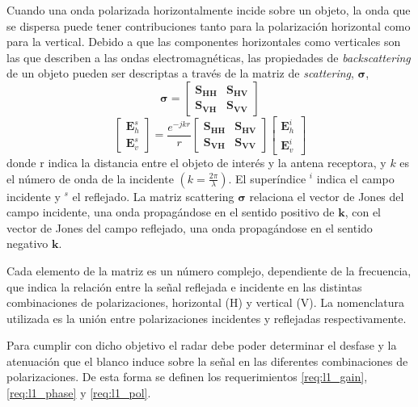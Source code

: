 Cuando una onda polarizada horizontalmente incide sobre un objeto, la onda que se dispersa puede tener contribuciones tanto para la polarización horizontal como para la vertical. Debido a que las componentes horizontales como verticales son las que describen a las ondas electromagnéticas, las propiedades de \textit{backscattering} de un objeto pueden ser descriptas a través de la matriz de \textit{scattering}, $\bm{\sigma}$,
\begin{equation}
  \bm{\sigma} = \begin{bmatrix} \bm{S}_{\bm{HH}} & \bm{S}_{\bm{HV}} \\ \bm{S}_{\bm{VH}} & \bm{S}_{\bm{VV}} \end{bmatrix}
\end{equation}
\begin{equation}
  \begin{bmatrix} \bm{E}_h^s \\ \bm{E}_v^s \end{bmatrix} = \dfrac{e^{-jkr}}{r} \begin{bmatrix} \bm{S}_{\bm{HH}} & \bm{S}_{\bm{HV}} \\ \bm{S}_{\bm{VH}} & \bm{S}_{\bm{VV}} \end{bmatrix} \begin{bmatrix} \bm{E}_h^i \\ \bm{E}_v^i \end{bmatrix}
\end{equation}
donde r indica la distancia entre el objeto de interés y la antena receptora, y $k$ es el número de onda de la incidente $(k = \frac{2\pi}{\lambda})$. El superíndice $^i$ indica el campo incidente y $^s$ el reflejado. La matriz scattering $\bm{\sigma}$ relaciona el vector de Jones del campo incidente, una onda propagándose en el sentido positivo de $\bm{k}$, con el vector de Jones del campo reflejado, una onda propagándose en el sentido negativo $\bm{k}$. 

Cada elemento de la matriz es un número complejo, dependiente de la frecuencia, que indica la relación entre la señal reflejada e incidente en las distintas combinaciones de polarizaciones, horizontal (H) y vertical (V). La nomenclatura utilizada es la unión entre polarizaciones incidentes y reflejadas respectivamente.

Para cumplir con dicho objetivo el radar debe poder determinar el desfase y la atenuación que el blanco induce sobre la señal en las diferentes combinaciones de polarizaciones. De esta forma se definen los requerimientos \ref{req:l1_gain}, \ref{req:l1_phase} y \ref{req:l1_pol}.


